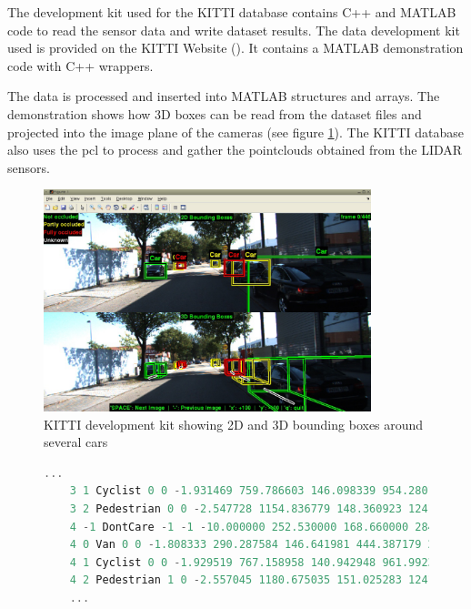 The development kit used for the KITTI database contains C++ and MATLAB code to read the sensor data and write dataset results. The data development kit used is provided on the KITTI Website (\cite{KarlsruheInstituteofTechnology}). It contains a MATLAB demonstration code with C++ wrappers. 

The data is processed and inserted into MATLAB structures and arrays. The demonstration shows how 3D boxes can be read from the dataset files and projected into the image plane of the cameras (see figure \ref{fig:kittidk}). The KITTI database also uses the \gls{pcl} to process and gather the pointclouds obtained from the LIDAR sensors.

\begin{figure}[htp]
	
	\centering
	\includegraphics[width=0.85\textwidth]{capstate/imgs/kittidk.png}
	
	\caption{KITTI development kit showing 2D and 3D bounding boxes around several cars}
	\label{fig:kittidk}
	
\end{figure}

\begin{figure}
\begin{center}
	\begin{lstlisting}[caption={KITTI dataset file snippet presenting frame\_id, object\_id, label, truncated and occluded flags, alpha, left top and right bottom coordinates, height, width and length, 3D coordinates (x,y,z) and rotation}, language=c++, label={lst: pop_grid}]
	...
	3 1 Cyclist 0 0 -1.931469 759.786603 146.098339 954.280160 374.000000 1.739063 0.824591 1.785241 1.821119 1.569936 5.783265 -1.642450
	3 2 Pedestrian 0 0 -2.547728 1154.836779 148.360923 1241.000000 321.627088 1.714062 0.767881 0.972283 6.463579 1.474131 7.560739 -1.860031
	4 -1 DontCare -1 -1 -10.000000 252.530000 168.660000 284.460000 202.850000 -1000.000000 -1000.000000 -1000.000000 -10.000000 -1.000000 -1.000000 -1.000000
	4 0 Van 0 0 -1.808333 290.287584 146.641981 444.387179 269.473545 2.000000 1.823255 4.433886 -4.934786 1.601945 14.098646 -2.139796
	4 1 Cyclist 0 0 -1.929519 767.158958 140.942948 961.992360 374.000000 1.739063 0.824591 1.785241 1.881359 1.534695 5.785600 -1.631447
	4 2 Pedestrian 1 0 -2.557045 1180.675035 151.025283 1241.000000 325.015204 1.714062 0.767881 0.972283 6.516488 1.497786 7.267796 -1.846627
	...	\end{lstlisting}
\end{center}
\end{figure}

